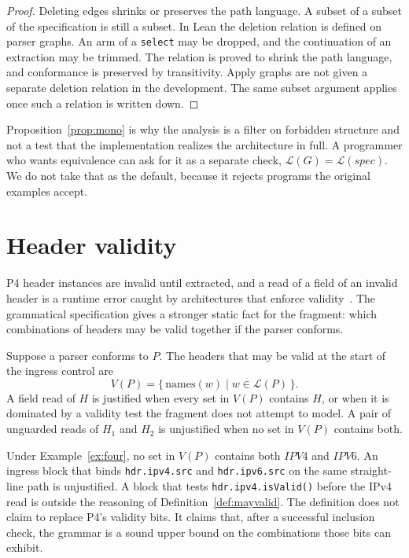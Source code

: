 \documentclass[a4paper,UKenglish,cleveref,autoref]{lipics-v2021}
\begin{document}
\begin{proof}
Deleting edges shrinks or preserves the path language.
A subset of a subset of the specification is still a subset.
In Lean the deletion relation is defined on parser graphs.
An arm of a \texttt{select} may be dropped, and the continuation of an extraction may be trimmed.
The relation is proved to shrink the path language, and conformance is preserved by transitivity.
Apply graphs are not given a separate deletion relation in the development.
The same subset argument applies once such a relation is written down.
\end{proof}

Proposition~\ref{prop:mono} is why the analysis is a filter on forbidden structure and not a test that the implementation realizes the architecture in full.
A programmer who wants equivalence can ask for it as a separate check, \(\mathcal{L}(G) = \mathcal{L}(\mathit{spec})\).
We do not take that as the default, because it rejects programs the original examples accept.

\section{Header validity}
\label{sec:valid}

P4 header instances are invalid until extracted, and a read of a field of an invalid header is a runtime error caught by architectures that enforce validity~\cite{p4langspec}.
The grammatical specification gives a stronger static fact for the fragment: which combinations of headers may be valid together if the parser conforms.

\begin{definition}
\label{def:mayvalid}
Suppose a parser conforms to \(P\).
The headers that may be valid at the start of the ingress control are
\[
  V(P) = \{\, \mathrm{names}(w) \mid w \in \mathcal{L}(P) \,\}.
\]
A field read of \(H\) is justified when every set in \(V(P)\) contains \(H\), or when it is dominated by a validity test the fragment does not attempt to model.
A pair of unguarded reads of \(H_1\) and \(H_2\) is unjustified when no set in \(V(P)\) contains both.
\end{definition}

\begin{example}
\label{ex:excl}
Under Example~\ref{ex:four}, no set in \(V(P)\) contains both \(\mathit{IPV4}\) and \(\mathit{IPV6}\).
An ingress block that binds \texttt{hdr.ipv4.src} and \texttt{hdr.ipv6.src} on the same straight-line path is unjustified.
A block that tests \texttt{hdr.ipv4.isValid()} before the IPv4 read is outside the reasoning of Definition~\ref{def:mayvalid}.
The definition does not claim to replace P4's validity bits.
It claims that, after a successful inclusion check, the grammar is a sound upper bound on the combinations those bits can exhibit.
\end{example}
\end{document}
